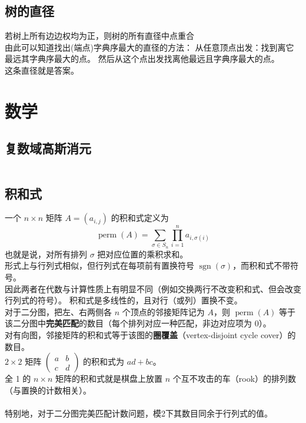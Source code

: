 \documentclass[a4paper]{report}
\newcommand{\cppcode}[1]{  
    \inputminted[mathescape]{cpp}{source/#1}  
}
\begin{document}
\section{树的直径}
若树上所有边边权均为正，则树的所有直径中点重合\\
由此可以知道找出(端点)字典序最大的直径的方法：
从任意顶点出发：找到离它最远其字典序最大的点。
然后从这个点出发找离他最远且字典序最大的点。\\
这条直径就是答案。

\chapter{数学}

\section{复数域高斯消元}
\cppcode{guass.cpp}

\section{积和式}
 一个 $n\times n$ 矩阵 $A=(a_{i,j})$ 的积和式定义为
$$
\operatorname{perm}(A)=\sum_{\sigma\in S_n}\prod_{i=1}^n a_{i,\sigma(i)}
$$
也就是说，对所有排列 $\sigma$ 把对应位置的乘积求和。\\
形式上与行列式相似，但行列式在每项前有置换符号 $\operatorname{sgn}(\sigma)$，而积和式不带符号。\\
因此两者在代数与计算性质上有明显不同（例如交换两行不改变积和式、但会改变行列式的符号）。
积和式是多线性的，且对行（或列）置换不变。\\
对于二分图，把左、右两侧各 $n$ 个顶点的邻接矩阵记为 $A$，则 $\operatorname{perm}(A)$
 等于该二分图中\textbf{完美匹配}的数目（每个排列对应一种匹配，非边对应项为 0）。\\
 对有向图，邻接矩阵的积和式等于该图的\textbf{圈覆盖}（vertex-disjoint cycle cover）的数目。\\
$2\times2$ 矩阵 $\begin{pmatrix}a&b\\c&d\end{pmatrix}$ 的积和式为 $ad+bc$。\\
全 1 的 $n\times n$ 矩阵的积和式就是棋盘上放置 $n$ 个互不攻击的车（rook）的排列数（与置换的计数相关）。\\
\\
特别地，对于二分图完美匹配计数问题，模2下其数目同余于行列式的值。\\
\end{document}
